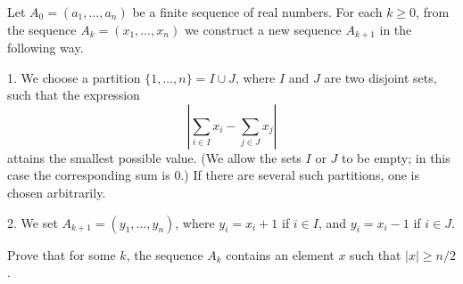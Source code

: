 Let $A_0 = (a_1, \ldots, a_n)$ be a finite sequence of real numbers. For each $k \geq 0$, from the sequence $A_k = (x_1, \ldots, x_n)$ we construct a new sequence $A_{k+1}$ in the following way.

1. We choose a partition $\{1, \ldots, n\} = I \cup J$, where $I$ and $J$ are two disjoint sets, such that the expression
\[
\left| \sum_{i \in I} x_i - \sum_{j \in J} x_j \right|
\]
attains the smallest possible value. (We allow the sets $I$ or $J$ to be empty; in this case the corresponding sum is $0$.) If there are several such partitions, one is chosen arbitrarily.

2. We set $A_{k+1} = (y_1, \ldots, y_n)$, where $y_i = x_i + 1$ if $i \in I$, and $y_i = x_i - 1$ if $i \in J$.

Prove that for some $k$, the sequence $A_k$ contains an element $x$ such that $|x| \geq n/2$.

